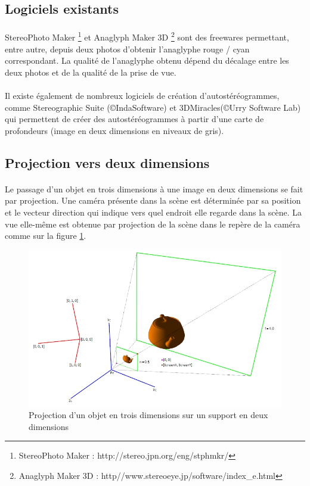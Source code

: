 \subsection{Logiciels existants}

\paragraph{}
	StereoPhoto Maker \footnote{StereoPhoto Maker : http://stereo.jpn.org/eng/stphmkr/} et Anaglyph Maker 3D \footnote{Anaglyph Maker 3D : http//www.stereoeye.jp/software/index\_e.html} sont des freewares permettant, entre autre, depuis deux photos d'obtenir l’anaglyphe rouge / cyan correspondant. La qualité de l'anaglyphe obtenu dépend du décalage entre les deux photos et de la qualité de la prise de vue. 
	
\paragraph{}
	Il existe également de nombreux logiciels de création d'autostéréogrammes, comme Stereographic Suite  (\copyright IndaSoftware) et 3DMiracles(\copyright Urry Software Lab) qui permettent de créer des autostéréogrammes à partir d'une carte de profondeurs (image en deux dimensions en niveaux de gris).
	
\subsection{Projection vers deux dimensions}

\paragraph{}
	Le passage d’un objet en trois dimensions à une image en deux dimensions se fait par projection. Une caméra présente dans la scène est déterminée par sa position et le vecteur direction qui indique vers quel endroit elle regarde dans la scène. La vue elle-même est obtenue par projection de la scène dans le repère de la caméra comme sur la figure  \ref{fig:projection}.
	
\begin{figure}[h]
		\centering
		\includegraphics[scale=0.7]{projection.png}
		\caption{\label{fig:projection} Projection d’un objet en trois dimensions sur un support en deux dimensions \protect \footnotemark }
\end{figure}
	

